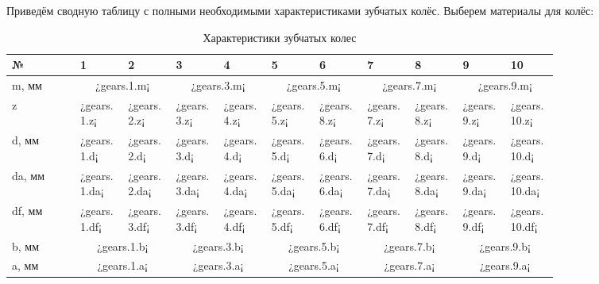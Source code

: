 \documentclass[14pt,a4paper,russian]{scrartcl}
\begin{document}
        Приведём сводную таблицу с полными необходимыми характеристиками зубчатых колёс.
        Выберем материалы для колёс:
        \begin{table}[h!]
            \begin{center}
                \begin{tabular}{p{0.1\linewidth}|p{0.07\linewidth}p{0.07\linewidth}p{0.07\linewidth}p{0.07\linewidth}p{0.07\linewidth}p{0.07\linewidth}p{0.07\linewidth}p{0.07\linewidth}p{0.07\linewidth}p{0.07\linewidth}}
                    \hline
                    №   & 1&2&3&4&5&6&7&8&9&10\\
                    \hline
                    m, мм  & \multicolumn{2}{c}{¿gears.1.m¡} & \multicolumn{2}{c}{¿gears.3.m¡} & \multicolumn{2}{c}{¿gears.5.m¡} & \multicolumn{2}{c}{¿gears.7.m¡} & \multicolumn{2}{c}{¿gears.9.m¡} \\
                    z       & ¿gears.1.z¡ &  ¿gears.2.z¡ &  ¿gears.3.z¡ &  ¿gears.4.z¡ &  ¿gears.5.z¡ & ¿gears.8.z¡ &   ¿gears.7.z¡ &  ¿gears.8.z¡ &  ¿gears.9.z¡ &  ¿gears.10.z¡ \\
                    d, мм   & ¿gears.1.d¡ &  ¿gears.2.d¡ &  ¿gears.3.d¡ &  ¿gears.4.d¡ &  ¿gears.5.d¡ & ¿gears.6.d¡ &   ¿gears.7.d¡ &  ¿gears.8.d¡ &  ¿gears.9.d¡ &  ¿gears.10.d¡ \\
                    da, мм  & ¿gears.1.da¡ & ¿gears.2.da¡ & ¿gears.3.da¡ & ¿gears.4.da¡ & ¿gears.5.da¡ & ¿gears.6.da¡ & ¿gears.7.da¡ & ¿gears.8.da¡ & ¿gears.9.da¡ & ¿gears.10.da¡ \\
                    df, мм  & ¿gears.1.df¡ & ¿gears.3.df¡ & ¿gears.3.df¡ & ¿gears.4.df¡ & ¿gears.5.df¡ & ¿gears.6.df¡ & ¿gears.7.df¡ & ¿gears.8.df¡ & ¿gears.9.df¡ & ¿gears.10.df¡ \\
                    b, мм & \multicolumn{2}{c}{¿gears.1.b¡} &  \multicolumn{2}{c}{¿gears.3.b¡} &  \multicolumn{2}{c}{¿gears.5.b¡} & \multicolumn{2}{c}{¿gears.7.b¡} &\multicolumn{2}{c}{¿gears.9.b¡} \\
                    a, мм & \multicolumn{2}{c}{¿gears.1.a¡} & \multicolumn{2}{c}{¿gears.3.a¡} & \multicolumn{2}{c}{¿gears.5.a¡} & \multicolumn{2}{c}{¿gears.7.a¡} & \multicolumn{2}{c}{¿gears.9.a¡} \\
                    \hline
                \end{tabular}
                \caption{{Характеристики зубчатых колес}}\label{tab:gears_digest}
            \end{center}
        \end{table}
\end{document}
